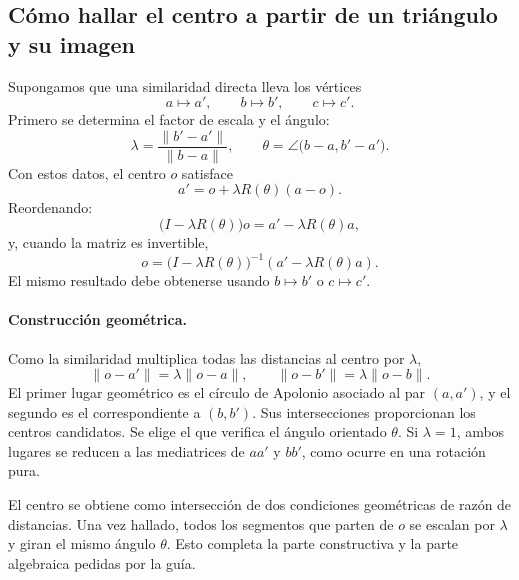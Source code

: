 \subsection{Cómo hallar el centro a partir de un triángulo y su imagen}

Supongamos que una similaridad directa lleva los vértices
\[
  a\mapsto a',\qquad b\mapsto b',\qquad c\mapsto c'.
\]
Primero se determina el factor de escala y el ángulo:
\[
  \lambda=\frac{\lVert b'-a'\rVert}{\lVert b-a\rVert},
  \qquad
  \theta=\angle\bigl(b-a,b'-a'\bigr).
\]
Con estos datos, el centro \(o\) satisface
\[
  a'=o+\lambda R(\theta)(a-o).
\]
Reordenando:
\[
  \bigl(I-\lambda R(\theta)\bigr)o
  =a'-\lambda R(\theta)a,
\]
y, cuando la matriz es invertible,
\[
  \boxed{
  o=
  \bigl(I-\lambda R(\theta)\bigr)^{-1}
  \left(a'-\lambda R(\theta)a\right)
  }.
\]
El mismo resultado debe obtenerse usando \(b\mapsto b'\) o \(c\mapsto c'\).

\paragraph{Construcción geométrica.}
Como la similaridad multiplica todas las distancias al centro por \(\lambda\),
\[
  \lVert o-a'\rVert=\lambda\lVert o-a\rVert,
  \qquad
  \lVert o-b'\rVert=\lambda\lVert o-b\rVert.
\]
El primer lugar geométrico es el círculo de Apolonio asociado al par \((a,a')\), y el segundo
es el correspondiente a \((b,b')\). Sus intersecciones proporcionan los centros candidatos.
Se elige el que verifica el ángulo orientado \(\theta\). Si \(\lambda=1\), ambos lugares se
reducen a las mediatrices de \(aa'\) y \(bb'\), como ocurre en una rotación pura.

\begin{resultado}
El centro se obtiene como intersección de dos condiciones geométricas de razón de distancias.
Una vez hallado, todos los segmentos que parten de \(o\) se escalan por \(\lambda\) y giran
el mismo ángulo \(\theta\). Esto completa la parte constructiva y la parte algebraica pedidas
por la guía.
\end{resultado}

